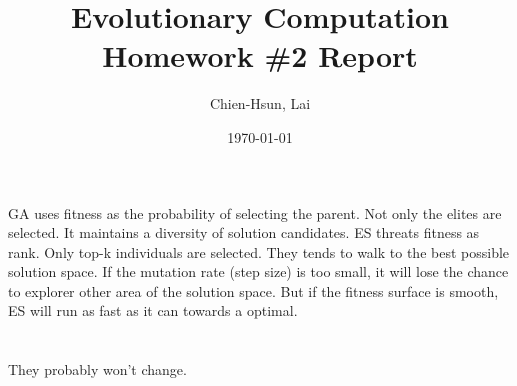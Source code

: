 \documentclass[A4]{article}
\title{Evolutionary Computation Homework \#2 Report}
\author{Chien-Hsun, Lai}
\date{\today}
\begin{document}
\maketitle

\section{}
\label{sec:p1}

GA uses fitness as the probability of selecting the parent.
Not only the elites are selected.
It maintains a diversity of solution candidates.
ES threats fitness as rank.
Only top-k individuals are selected.
They tends to walk to the best possible solution space.
If the mutation rate (step size) is too small,
it will lose the chance to explorer other area of the solution space.
But if the fitness surface is smooth, ES will run as fast as it can towards a optimal.

\section{}
\label{sec:p2}

They probably won't change.

\section{}
\label{sec:p3}
\end{document}
